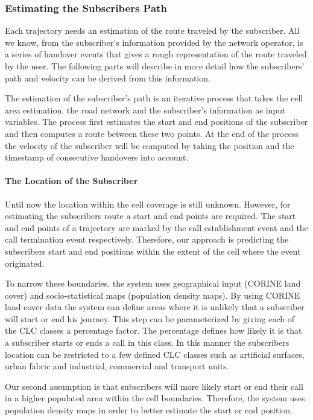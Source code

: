 \documentclass[twocolumn]{bmcart}%
\begin{document}
\subsubsection*{Estimating the Subscribers Path}
Each trajectory needs an estimation of the route traveled by the subscriber. All we know, from the subscriber's information provided by the network operator, is a series of handover events that gives a rough representation of the route traveled by the user. The following parts will describe in more detail how the subscribers’ path and velocity can be derived from this information.

The estimation of the subscriber's path is an iterative process that takes the cell area estimation, the road network and the subscriber's information as input variables. The process first estimates the start and end positions of the subscriber and then computes a route between these two points. At the end of the process the velocity of the subscriber will be computed by taking the position and the timestamp of consecutive handovers into account.


\paragraph{The Location of the Subscriber}
Until now the location within the cell coverage is still unknown. However, for estimating the subscribers route a start and end points are required. The start and end points of a trajectory are marked by the call establishment event and the call termination event respectively. Therefore, our approach is predicting the subscribers start and end positions within the extent of the cell where the event originated.

To narrow these boundaries, the system uses geographical input (CORINE
land cover) and socio-statistical maps (population density maps).
By using CORINE land cover data the system can define areas where
it is unlikely that a subscriber will start or end his journey. This step can be
parameterized by giving each of the CLC classes a percentage factor. The
percentage defines how likely it is that a subscriber starts or ends a call in
this class. In this manner the subscribers location can be restricted to a few defined CLC classes such as 	artificial surfaces, urban fabric and industrial, commercial and transport units. 

Our second assumption is that subscribers will more likely start or end
their call in a higher populated area within the cell boundaries. Therefore,
the system uses population density maps in order to better estimate the
start or end position.
\end{document}
